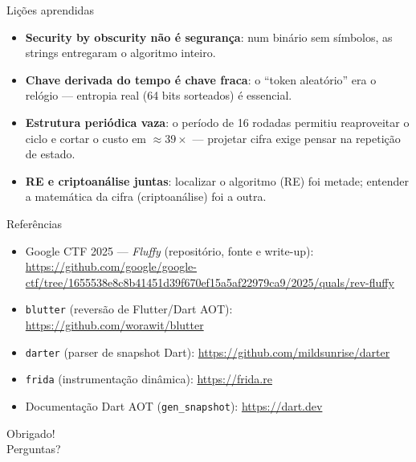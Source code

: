 \documentclass[aspectratio=169]{beamer}
\begin{document}
\begin{frame}{Lições aprendidas}
  \begin{itemize}
    \item \textbf{Security by obscurity não é segurança}: num binário sem
          símbolos, as strings entregaram o algoritmo inteiro.
    \item \textbf{Chave derivada do tempo é chave fraca}: o ``token aleatório''
          era o relógio --- entropia real (64 bits sorteados) é essencial.
    \item \textbf{Estrutura periódica vaza}: o período de 16 rodadas permitiu
          reaproveitar o ciclo e cortar o custo em $\approx39\times$ --- projetar
          cifra exige pensar na repetição de estado.
    \item \textbf{RE e criptoanálise juntas}: localizar o algoritmo (RE) foi
          metade; entender a matemática da cifra (criptoanálise) foi a outra.
  \end{itemize}
\end{frame}

\begin{frame}{Referências}
  \begin{itemize}
    \item Google CTF 2025 --- \emph{Fluffy} (repositório, fonte e write-up):
          \url{https://github.com/google/google-ctf/tree/1655538e8c8b41451d39f670ef15a5af22979ca9/2025/quals/rev-fluffy}
    \item \texttt{blutter} (reversão de Flutter/Dart AOT):
          \url{https://github.com/worawit/blutter}
    \item \texttt{darter} (parser de snapshot Dart):
          \url{https://github.com/mildsunrise/darter}
    \item \texttt{frida} (instrumentação dinâmica): \url{https://frida.re}
    \item Documentação Dart AOT (\texttt{gen\_snapshot}): \url{https://dart.dev}
  \end{itemize}
  \vspace{0.5em}
  \begin{center}
    {\large Obrigado!}\\[0.2em]
    {\small Perguntas?}
  \end{center}
\end{frame}
\end{document}
